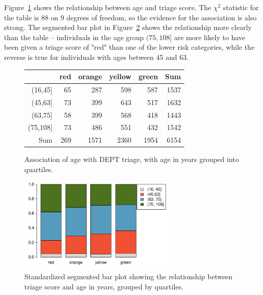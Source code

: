 Figure~\ref{figure:triageAgeCatTable} shows the relationship between age and triage score. The $\chi^2$ statistic for the table is 88 on 9 degrees of freedom, so the evidence for the association is also strong.  The segmented bar plot in Figure~\ref{figure:ageTriageSegBarDanishED} shows the relationship more clearly than the table -- individuals in the age group $(75, 108]$ are more likely to have been given a triage score of "red" than one of the lower risk categories, while the reverse is true for individuals with ages between 45 and 63.  


\begin{figure}[ht]
\centering
\begin{tabular}{rrrrrr}
  \hline
 & red & orange & yellow & green & Sum \\
  \hline
(16,45] & 65 & 287 & 598 & 587 & 1537 \\
  (45,63] & 73 & 399 & 643 & 517 & 1632 \\
  (63,75] & 58 & 399 & 568 & 418 & 1443 \\
  (75,108] & 73 & 486 & 551 & 432 & 1542 \\
  Sum & 269 & 1571 & 2360 & 1954 & 6154 \\
   \hline
\end{tabular}
\caption{Association of age with
       DEPT triage, with age in years grouped into quartiles.}
\label{figure:triageAgeCatTable}
\end{figure}


\begin{figure}[!tbh]
  \centering
  \includegraphics[width=0.70\textwidth]
  {ch_logistic_regression_oi_biostat/figures/ageTriageSegBarDanishED/ageTriageSegBarDanishED.pdf}
    \caption{Standardized segmented bar plot showing the relationship between triage score and age in years, grouped by quartiles.}
    \label{figure:ageTriageSegBarDanishED}
\end{figure}

